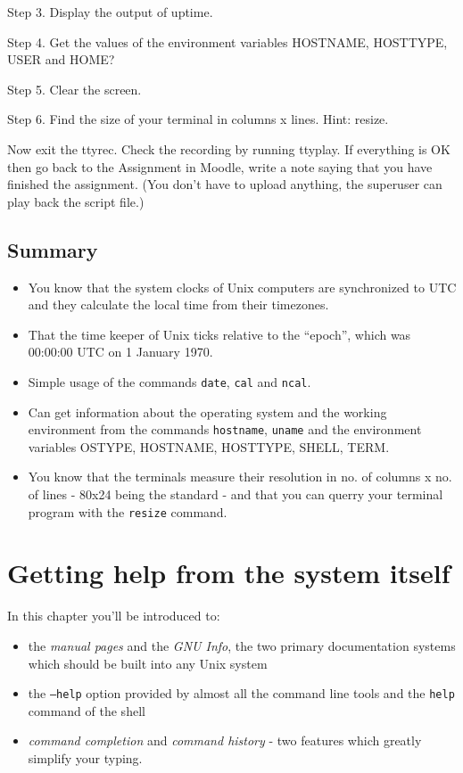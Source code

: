 \documentclass[11pt,a4paper,twoside]{article}
\begin{document}
Step 3. Display the output of uptime.

Step 4. Get the values of the environment variables HOSTNAME, HOSTTYPE, USER
and HOME?

Step 5. Clear the screen.

Step 6. Find the size of your terminal in columns x lines. Hint: resize.

Now exit the ttyrec. Check the recording by running ttyplay. If everything is
OK then go back to the Assignment in Moodle, write a note saying that
you have finished the assignment. (You don't have to upload anything, the
superuser can play back the script file.)

\subsection*{Summary}
\begin{itemize}
\item You know that the system clocks of Unix computers are synchronized
to UTC and they calculate the local time from their timezones.

\item That the time keeper of Unix ticks relative to the ``epoch'', which was
00:00:00 UTC on 1 January 1970.

\item Simple usage of the commands \texttt{date}, \texttt{cal} and 
\texttt{ncal}.

\item Can get information about the operating system and the working 
environment from the commands \texttt{hostname}, \texttt{uname} and the 
environment variables OSTYPE, HOSTNAME, HOSTTYPE, SHELL, TERM.

\item You know that the terminals measure their resolution in no. of columns
x no. of lines - 80x24 being the standard - and that you can querry your 
terminal program with the \texttt{resize} command.


\end{itemize}

\newpage

\section{Getting help from the system itself}

In this chapter you'll be introduced to:
\begin{itemize}
\item the \emph{manual pages} and the \emph{GNU Info}, the two primary 
documentation systems which should be built into any Unix system

\item the \texttt{--help} option provided by almost all the command line 
tools and the \texttt{help} command of the shell

\item \emph{command completion} and \emph{command history} - two features 
which greatly simplify your typing. 

\end{itemize}
\end{document}
